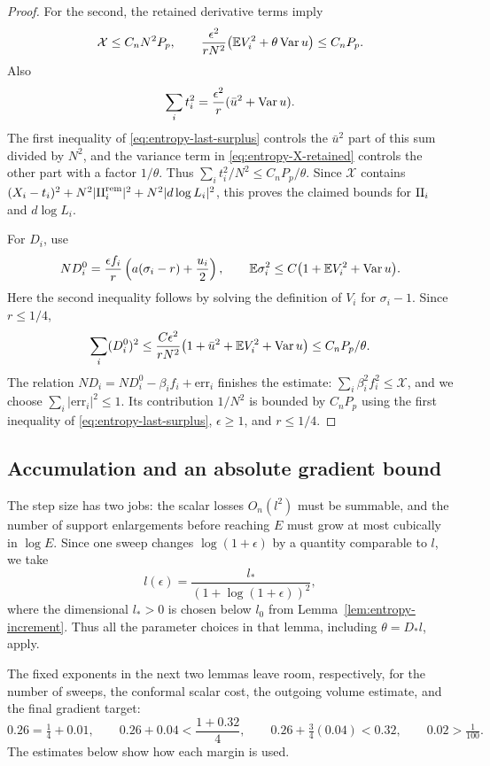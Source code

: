 \begin{proof}
For the second, the retained derivative terms imply
\begin{equation}\label{eq:entropy-X-retained}
 \mathcal X\leq C_n N^2P_p,\qquad
 \frac{\epsilon^2}{rN^2}
       \bigl(\mathbb E V_i^2+\theta\operatorname{Var} u\bigr)\leq C_nP_p.
\end{equation}
Also
\[
 \sum_i t_i^2=\frac{\epsilon^2}{r}(\bar u^2+\operatorname{Var} u).
\]
The first inequality of \eqref{eq:entropy-last-surplus} controls
the \(\bar u^2\) part of this sum divided by \(N^2\), and the variance
term in \eqref{eq:entropy-X-retained} controls the other part with
a factor \(1/\theta\).  Thus
\(\sum_i t_i^2/N^2\leq C_nP_p/\theta\).  Since \(\mathcal X\) contains
\((X_i-t_i)^2+N^2|\mathrm{II}_i^{\mathrm{rem}}|^2+N^2|d\log L_i|^2\), this proves the
claimed bounds for \(\mathrm{II}_i\) and \(d\log L_i\).

For \(D_i\), use
\[
 ND_i^0=\frac{\epsilon f_i}{r}
             \left(a(\sigma_i-r)+\frac{u_i}{2}\right),\qquad
 \mathbb E \sigma_i^2\leq C\bigl(1+\mathbb E V_i^2+\operatorname{Var} u\bigr).
\]
Here the second inequality follows by solving the definition of \(V_i\)
for \(\sigma_i-1\).  Since \(r\leq1/4\),
\[
 \sum_i(D_i^0)^2\leq
 \frac{C\epsilon^2}{rN^2}
       \bigl(1+\bar u^2+\mathbb E V_i^2+\operatorname{Var} u\bigr)
 \leq C_nP_p/\theta.
\]
The relation \(ND_i=ND_i^0-\beta_i f_i+\mathrm{err}_i\) finishes the
estimate: \(\sum_i\beta_i^2f_i^2\leq\mathcal X\), and we choose
\(\sum_i|\mathrm{err}_i|^2\leq1\).  Its contribution \(1/N^2\) is
bounded by \(C_nP_p\) using the first inequality of
\eqref{eq:entropy-last-surplus}, \(\epsilon\geq1\), and \(r\leq1/4\).
\end{proof}

\subsection{Accumulation and an absolute gradient bound}

The step size has two jobs: the scalar losses \(O_n(l^2)\) must be
summable, and the number of support enlargements before reaching \(E\)
must grow at most cubically in \(\log E\).  Since one sweep changes
\(\log(1+\epsilon)\) by a quantity comparable to \(l\), we take
\begin{equation}\label{eq:entropy-step-schedule}
 l(\epsilon)=\frac{l_*}{(1+\log(1+\epsilon))^2},
\end{equation}
where the dimensional \(l_*>0\) is chosen below \(l_0\) from
Lemma~\ref{lem:entropy-increment}.  Thus all the parameter choices in
that lemma, including \(\theta=D_*l\), apply.

The fixed exponents in the next two lemmas leave room, respectively,
for the number of sweeps, the conformal scalar cost, the outgoing
volume estimate, and the final gradient target:
\[
 0.26=\tfrac14+0.01,\qquad
 0.26+0.04<\frac{1+0.32}{4},\qquad
 0.26+\tfrac34(0.04)<0.32,\qquad
 0.02>\tfrac1{100}.
\]
The estimates below show how each margin is used.

